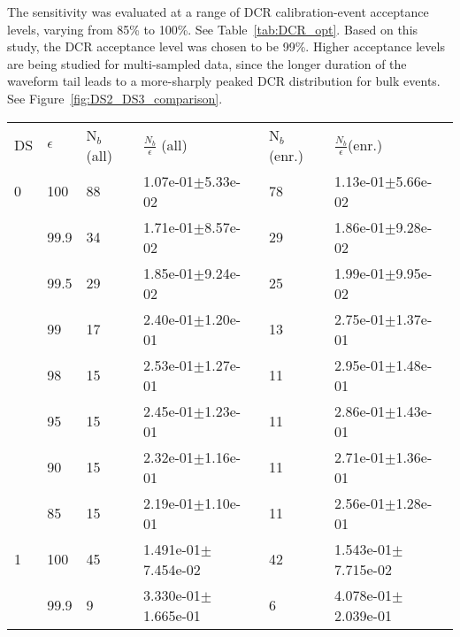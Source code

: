 The sensitivity was evaluated at a range of DCR calibration-event acceptance levels, varying from 85\% to 100\%. See Table~\ref{tab:DCR_opt}. Based on this study, the DCR acceptance level was chosen to be 99\%. Higher acceptance levels are being studied for multi-sampled data, since the longer duration of the waveform tail leads to a more-sharply peaked DCR distribution for bulk events. See Figure~\ref{fig:DS2_DS3_comparison}. 

\begin{table}[h]
\centering
\begin{tabular}{l l l l l l}
DS & $\epsilon$ & N$_b$ (all) & $\frac{N_{b}}{\epsilon}$ (all) & N$_b$ (enr.) & $\frac{N_{b}}{\epsilon} $(enr.) \\ 
           0 &   100 &                     88 &             1.07e-01$\pm$5.33e-02 &                   78 &             1.13e-01$\pm$5.66e-02 \\
             &   99.9 &                     34 &             1.71e-01$\pm$8.57e-02 &                   29 &             1.86e-01$\pm$9.28e-02 \\
             &   99.5 &                     29 &             1.85e-01$\pm$9.24e-02 &                   25 &             1.99e-01$\pm$9.95e-02 \\
             &     99 &                     17 &             2.40e-01$\pm$1.20e-01 &                   13 &             2.75e-01$\pm$1.37e-01 \\
             &     98 &                     15 &             2.53e-01$\pm$1.27e-01 &                   11 &             2.95e-01$\pm$1.48e-01 \\
             &     95 &                     15 &             2.45e-01$\pm$1.23e-01 &                   11 &             2.86e-01$\pm$1.43e-01 \\
             &     90 &                     15 &             2.32e-01$\pm$1.16e-01 &                   11 &             2.71e-01$\pm$1.36e-01 \\
             &     85 &                     15 &             2.19e-01$\pm$1.10e-01 &                   11 &             2.56e-01$\pm$1.28e-01 \\
          \hline
          1 &    100 &                     45 &            1.491e-01$\pm$7.454e-02 &                   42 &            1.543e-01$\pm$7.715e-02 \\
            &    99.9 &                      9 &            3.330e-01$\pm$1.665e-01 &                    6 &            4.078e-01$\pm$2.039e-01 \\

\end{tabular}
\end{table}
